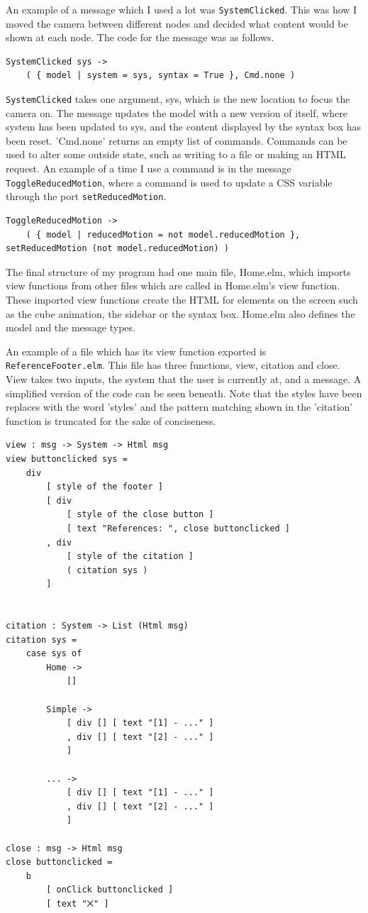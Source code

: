 \documentclass{l4proj}
\begin{document}
An example of a message which I used a lot was \texttt{SystemClicked}.  This was how I moved the camera between different nodes and decided what content would be shown at each node.  The code for the message was as follows.

\begin{lstlisting}
SystemClicked sys ->
    ( { model | system = sys, syntax = True }, Cmd.none )
\end{lstlisting}

\texttt{SystemClicked} takes one argument, sys, which is the new location to focus the camera on.  The message updates the model with a new version of itself, where system has been updated to sys, and the content displayed by the syntax box has been reset.  'Cmd.none' returns an empty list of commands.  Commands can be used to alter some outside state, such as writing to a file or making an HTML request.  An example of a time I use a command is in the message \texttt{ToggleReducedMotion}, where a command is used to update a CSS variable through the port \texttt{setReducedMotion}.

\begin{lstlisting}
ToggleReducedMotion ->
    ( { model | reducedMotion = not model.reducedMotion }, setReducedMotion (not model.reducedMotion) )
\end{lstlisting}

The final structure of my program had one main file, Home.elm, which imports view functions from other files which are called in Home.elm's view function.  These imported view functions create the HTML for elements on the screen such as the cube animation, the sidebar or the syntax box.  Home.elm also defines the model and the message types.

An example of a file which has its view function exported is \texttt{ReferenceFooter.elm}.  This file has three functions, view, citation and close.  View takes two inputs, the system that the user is currently at, and a message.  A simplified version of the code can be seen beneath.  Note that the styles have been replaces with the word 'styles' and the pattern matching shown in the 'citation' function is truncated for the sake of conciseness.

\begin{lstlisting} 
view : msg -> System -> Html msg
view buttonclicked sys =
    div 
        [ style of the footer ]
        [ div
            [ style of the close button ]
            [ text "References: ", close buttonclicked ]
        , div
            [ style of the citation ]
            ( citation sys )
        ]


citation : System -> List (Html msg)
citation sys =
    case sys of
        Home ->
            []

        Simple ->
            [ div [] [ text "[1] - ..." ]
            , div [] [ text "[2] - ..." ]
            ]

        ... ->
            [ div [] [ text "[1] - ..." ]
            , div [] [ text "[2] - ..." ]
            ]
        
close : msg -> Html msg
close buttonclicked =
    b
        [ onClick buttonclicked ]
        [ text "⨉" ]
\end{lstlisting}
\end{document}
